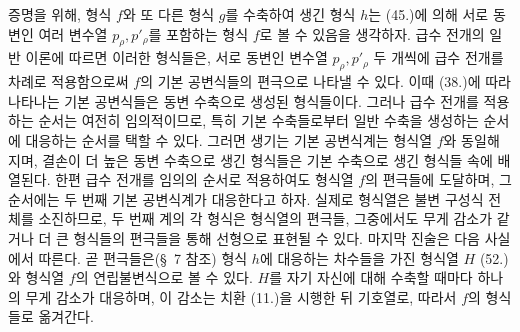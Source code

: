 
증명을 위해, 형식 $f$와 또 다른 형식 $g$를 수축하여 생긴 형식 $h$는 (45.)에 의해 서로 동변인 여러 변수열 $p_\rho,p'_\rho$를 포함하는 형식 $f$로 볼 수 있음을 생각하자. 급수 전개의 일반 이론에 따르면 이러한 형식들은, 서로 동변인 변수열 $p_\rho,p'_\rho$ 두 개씩에 급수 전개를 차례로 적용함으로써 $f$의 기본 공변식들의 편극으로 나타낼 수 있다. 이때 (38.)에 따라 나타나는 기본 공변식들은 동변 수축으로 생성된 형식들이다. 그러나 급수 전개를 적용하는 순서는 여전히 임의적이므로, 특히 기본 수축들로부터 일반 수축을 생성하는 순서에 대응하는 순서를 택할 수 있다. 그러면 생기는 기본 공변식계는 형식열 $f$와 동일해지며, 결손이 더 높은 동변 수축으로 생긴 형식들은 기본 수축으로 생긴 형식들 속에 배열된다. 한편 급수 전개를 임의의 순서로 적용하여도 형식열 $f$의 편극들에 도달하며, 그 순서에는 두 번째 기본 공변식계가 대응한다고 하자. 실제로 형식열은 불변 구성식 전체를 소진하므로, 두 번째 계의 각 형식은 형식열의 편극들, 그중에서도 무게 감소가 같거나 더 큰 형식들의 편극들을 통해 선형으로 표현될 수 있다. 마지막 진술은 다음 사실에서 따른다. 곧 편극들은(\S\ 7 참조) 형식 $h$에 대응하는 차수들을 가진 형식열 $H$ (52.)와 형식열 $f$의 연립불변식으로 볼 수 있다. $H$를 자기 자신에 대해 수축할 때마다 하나의 무게 감소가 대응하며, 이 감소는 치환 (11.)을 시행한 뒤 기호열로, 따라서 $f$의 형식들로 옮겨간다.

